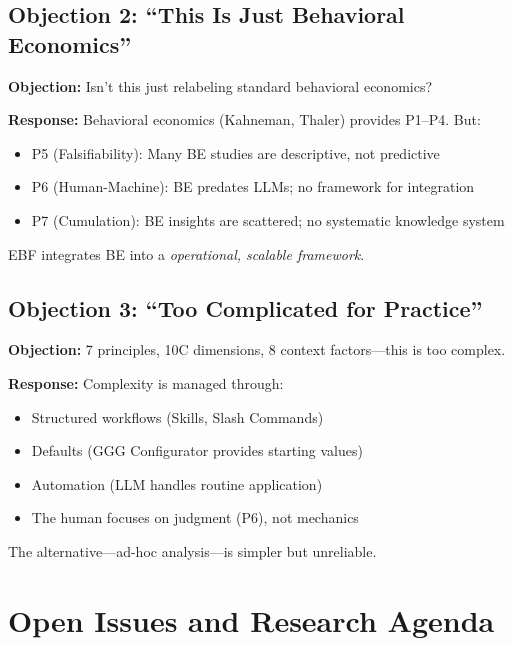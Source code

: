 \subsection{Objection 2: ``This Is Just Behavioral Economics''}

\textbf{Objection:} Isn't this just relabeling standard behavioral economics?

\textbf{Response:} Behavioral economics (Kahneman, Thaler) provides P1--P4. But:
\begin{itemize}[nosep]
    \item P5 (Falsifiability): Many BE studies are descriptive, not predictive
    \item P6 (Human-Machine): BE predates LLMs; no framework for integration
    \item P7 (Cumulation): BE insights are scattered; no systematic knowledge system
\end{itemize}
EBF integrates BE into a \textit{operational, scalable framework}.


\subsection{Objection 3: ``Too Complicated for Practice''}

\textbf{Objection:} 7 principles, 10C dimensions, 8 context factors---this is too complex.

\textbf{Response:} Complexity is managed through:
\begin{itemize}[nosep]
    \item Structured workflows (Skills, Slash Commands)
    \item Defaults (GGG Configurator provides starting values)
    \item Automation (LLM handles routine application)
    \item The human focuses on judgment (P6), not mechanics
\end{itemize}
The alternative---ad-hoc analysis---is simpler but unreliable.


\section{Open Issues and Research Agenda}
\label{sec:pr-open}

